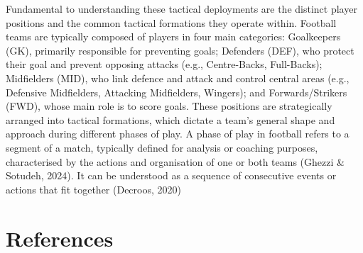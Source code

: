 \documentclass[
  a4paper,
  twoside]{uoe-thesis-template}
\begin{document}
Fundamental to understanding these tactical deployments are the distinct
player positions and the common tactical formations they operate within.
Football teams are typically composed of players in four main
categories: Goalkeepers (GK), primarily responsible for preventing
goals; Defenders (DEF), who protect their goal and prevent opposing
attacks (e.g., Centre-Backs, Full-Backs); Midfielders (MID), who link
defence and attack and control central areas (e.g., Defensive
Midfielders, Attacking Midfielders, Wingers); and Forwards/Strikers
(FWD), whose main role is to score goals. These positions are
strategically arranged into tactical formations, which dictate a team's
general shape and approach during different phases of play. A phase of
play in football refers to a segment of a match, typically defined for
analysis or coaching purposes, characterised by the actions and
organisation of one or both teams (Ghezzi \& Sotudeh, 2024). It can be
understood as a sequence of consecutive events or actions that fit
together (Decroos, 2020)


\chapter*{References}\label{references}

\end{document}
